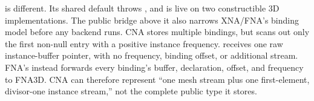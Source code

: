  is different. Its shared default throws
, and is live on two constructible 3D implementations. The public
bridge above it also narrows XNA/FNA's binding model before any backend runs. CNA stores
multiple bindings, but scans out only the first non-null entry with a positive instance
frequency.  receives one raw instance-buffer pointer, with no frequency,
binding offset, or additional stream. FNA's  instead
forwards every binding's buffer, declaration, offset, and frequency to FNA3D. CNA can
therefore represent ``one mesh stream plus one first-element, divisor-one instance stream,''
not the complete public type it stores.

\begingroup
\small
\setlength{\tabcolsep}{3.5pt}
\renewcommand{\arraystretch}{1.15}
